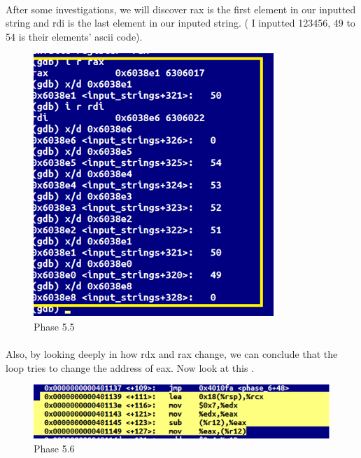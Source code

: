 \documentclass[a4paper]{article}
\begin{document}
\paragraph{}
After some investigations, we will discover rax is the first element in our inputted string and rdi is the last element in our inputed string. ( I inputted 123456, 49 to 54 is their elements' ascii code).
\newpage
\begin{figure}[h!]
  \includegraphics[width=\linewidth]{bai5_5.png}
  \caption{Phase 5.5}
  \label{}
\end{figure}

\paragraph{}
Also, by looking deeply in how rdx and rax change, we can conclude that the loop tries to change the address of eax.  
Now look at this . 

\begin{figure}[h!]
  \includegraphics[width=\linewidth]{bai5_6.png}
  \caption{Phase 5.6}
  \label{}
\end{figure}
\end{document}
